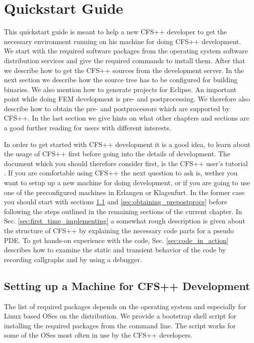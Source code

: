 \chapter{Quickstart Guide}

This  quickstart guide  is meant  to help  a new  CFS++ developer  to  get the
necessary environment running  on his machine for doing  CFS++ development. We
start with the  required software packages from the  operating system software
distribution services  and give the  required commands to install  them. After
that we describe how to get the CFS++ sources from the development server.  In
the next  section we  describe how the  source tree  has to be  configured for
building binaries.  We also mention how  to generate projects  for Eclipse. An
important point  while doing  FEM development is  pre- and  postprocessing. We
therefore also  describe how to obtain  the pre- and  postprocessors which are
supported by CFS++.  In the last section we give hints  on what other chapters
and sections are a good further reading for users with different interests.

In order  to get started with  CFS++ development it  is a good idea,  to learn
about  the   usage  of   CFS++  first  before   going  into  the   details  of
development. The  document which you  should therefore consider first,  is the
CFS++ user's tutorial \cite{Simkovics2010}. If you are comfortable using CFS++
the next  question to ask is,  wether you want to  setup up a  new machine for
doing  development, or  if  you are  going  to use  one  of the  preconfigured
machines in Erlangen or Klagenfurt.  In  the former case you should start with
sections  \ref{sec:list_of_ext_packages}  and \ref{sec:obtaining_prepostprocs}
before following the  steps outlined in the remaining  sections of the current
chapter.    In  Sec.    \ref{sec:first_time_implementing}  a   somewhat  rough
description is given about the  structure of CFS++ by explaining the necessary
code parts for  a pseudo PDE.  To get hands-on experience  with the code, Sec.
\ref{sec:code_in_action}  describes how  to examine  the static  and transient
behavior of the code by recording callgraphs and by using a debugger.

\section{Setting up a Machine for CFS++ Development}
\label{sec:list_of_ext_packages}

The list of  required packages depends on the  operating system and especially
for Linux based OSes on the distribution.  We provide a bootstrap shell script
for installing the required packages  from the command line.  The script works
for some of the  OSes most often in use by the CFS++  developers.

